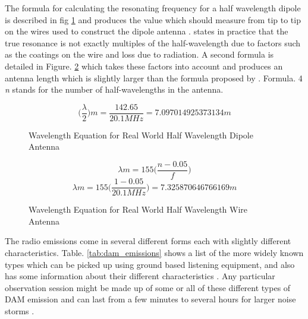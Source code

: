 \documentclass[runningheads,a4paper]{llncs}
\begin{document}
The formula for calculating the resonating frequency for a half wavelength dipole is described in fig \ref{fig:wavelength_equation_dipole} and produces the value which should measure from tip to tip on the wires used to construct the dipole antenna \citep{nasa12}. \cite{RSGB-14} states in practice that the true resonance is not exactly multiples of the half-wavelength due to factors such as the coatings on the wire and loss due to radiation. A second formula is detailed in Figure. \ref{fig:wavelength_equation_wire_antenna} which takes these factors into account and produces an antenna length which is slightly larger than the formula proposed by \citep{nasa12}. Formula. 4 \textit{n} stands for the number of half-wavelengths in the antenna.

%
\begin{figure}[here]
  \centering
  \begin{equation}  	
    \bigg(\frac{\lambda}{2}\bigg)m = \frac{142.65}{20.1 MHz} = 7.097014925373134 m
  \end{equation}
  \caption{Wavelength Equation for Real World Half Wavelength Dipole Antenna}
  \label{fig:wavelength_equation_dipole}
\end{figure}
%

%
\begin{figure}[here]
  \centering
  \begin{equation}  	
    \lambda m = 155 \bigg(\frac{n - 0.05}{f}\bigg)
  \end{equation}
  \begin{equation}  	
    \lambda m = 155 \bigg(\frac{1 - 0.05}{20.1 MHz}\bigg)  = 7.325870646766169 m
  \end{equation}
  \caption{Wavelength Equation for Real World Half Wavelength Wire Antenna}
  \label{fig:wavelength_equation_wire_antenna}
\end{figure}
%

The radio emissions come in several different forms each with slightly different characteristics. Table. \ref{tab:dam_emissions} shows a list of the more widely known types which can be picked up using ground based listening equipment, and also has some information about their different characteristics \citep{wilkinson94}. Any particular observation session might be made up of some or all of these different types of \gls{DAM} emission and can last from a few minutes to several hours for larger noise storms \citep{wilkinson94}.
\end{document}
